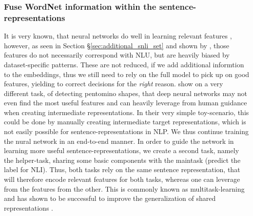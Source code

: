 \subsubsection{Fuse WordNet information within the sentence-representations}\label{sec:mt_learning_intro}
It is very known, that neural networks do well in learning relevant features \citep{bengio2013representation}, however, as seen in Section §\ref{sec:additional_snli_set} and shown by \cite{gururangan2018annotation}, those features do not necessarily correspond with \ac{NLU}, but are heavily biased by dataset-specific patterns. These are not reduced, if we add additional informtion to the embeddings, thus we still need to rely on the full model to pick up on good features, yielding to correct decisions for the \textit{right} reason. \cite{gulccehre2016knowledge} show on a very different task, of detecting pentomino shapes, that deep neural networks may not even find the most useful features and can heavily leverage from human guidance when creating intermediate representations. In their very simple toy-scenario, this could be done by manually creating intermediate target representations, which is not easily possible for sentence-representations in \ac{NLP}. We thus continue training the nural network in an end-to-end manner. In order to guide the network in learning more useful sentence-representations, we create a second task, namely the helper-task, sharing some basic components with the maintask (predict the label for \ac{NLI}). Thus, both tasks rely on the same sentence representation, that will therefore encode relevant features for both tasks, whereas one can leverage from the features from the other. This is commonly known as multitask-learning and has shown to be successful to improve the generalization of shared representations \citep{nangia2017repeval}.
